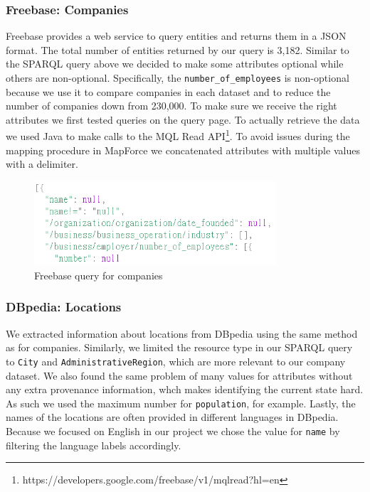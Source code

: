\subsubsection{Freebase: Companies}
Freebase provides a web service to query entities and returns them in a JSON format. The total number of entities returned by our query is 3,182. Similar to the SPARQL query above we decided to make some attributes optional while others are non-optional. Specifically, the \texttt{number\_of\_employees} is non-optional because we use it to compare companies in each dataset and to reduce the number of companies down from 230,000. To make sure we receive the right attributes we first tested queries on the query page. To actually retrieve the data we used Java to make calls to the MQL Read API\footnote{https://developers.google.com/freebase/v1/mqlread?hl=en}. To avoid issues during the mapping procedure in MapForce we concatenated attributes with multiple values with a delimiter. 

\begin{figure}[H]
	\begin{center}
	\includegraphics[width=9cm]{Freebase_query}
	\caption[Freebase query for companies]{Freebase query for companies}
	\label{fig:db}
	\end{center}
\end{figure}

\subsubsection{DBpedia: Locations}
We extracted information about locations from DBpedia using the same method as for companies. Similarly, we limited the resource type in our SPARQL query to \texttt{City} and \texttt{AdministrativeRegion}, which are more relevant to our company dataset. We also found the same problem of many values for attributes without any extra provenance information, whch makes identifying the current state hard. As such we used the maximum number for \texttt{population}, for example. Lastly, the names of the locations are often provided in different languages in DBpedia. Because we focused on English in our project we chose the value for \texttt{name} by filtering the language labels accordingly. 

















